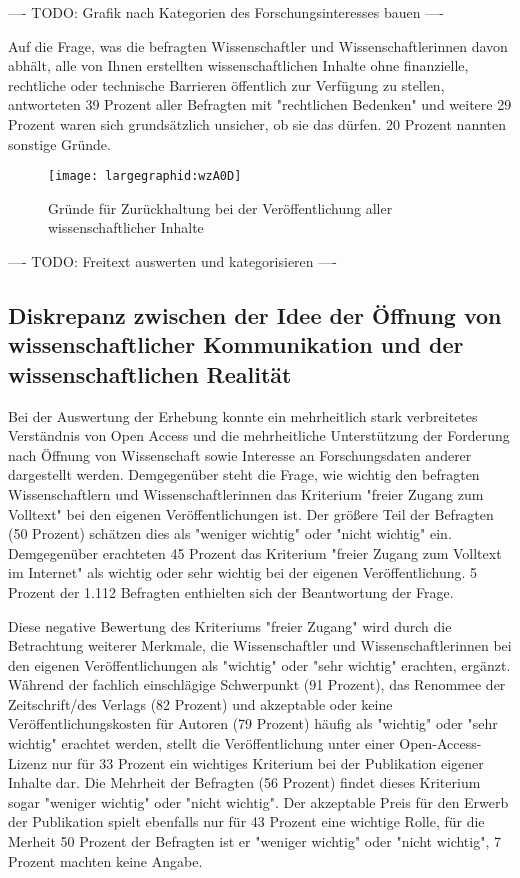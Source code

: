 ---- TODO: Grafik nach Kategorien des Forschungsinteresses bauen ----

Auf die Frage, was die befragten Wissenschaftler und Wissenschaftlerinnen davon abhält, alle von Ihnen erstellten wissenschaftlichen Inhalte ohne finanzielle, rechtliche oder technische Barrieren öffentlich zur Verfügung zu stellen, antworteten 39 Prozent aller Befragten mit "rechtlichen Bedenken" und weitere 29 Prozent waren sich grundsätzlich unsicher, ob sie das dürfen. 20 Prozent nannten sonstige Gründe.

\begin{figure}[h!]
\texttt{[image: largegraphid:wzA0D]}
\caption{Gründe für Zurückhaltung bei der Veröffentlichung aller wissenschaftlicher Inhalte}
\end{figure}

---- TODO: Freitext auswerten und kategorisieren ----

\subsection{Diskrepanz zwischen der Idee der Öffnung von wissenschaftlicher Kommunikation und der wissenschaftlichen Realität}

Bei der Auswertung der Erhebung konnte ein mehrheitlich stark verbreitetes Verständnis von Open Access und die mehrheitliche Unterstützung der Forderung nach Öffnung von Wissenschaft sowie Interesse an Forschungsdaten anderer dargestellt werden. Demgegenüber steht die Frage, wie wichtig den befragten Wissenschaftlern und Wissenschaftlerinnen das Kriterium "freier Zugang zum Volltext" bei den eigenen Veröffentlichungen ist. Der größere Teil der Befragten (50 Prozent) schätzen dies als "weniger wichtig" oder "nicht wichtig" ein. Demgegenüber erachteten 45 Prozent das Kriterium "freier Zugang zum Volltext im Internet" als wichtig oder sehr wichtig bei der eigenen Veröffentlichung. 5 Prozent der 1.112 Befragten enthielten sich der Beantwortung der Frage.

Diese negative Bewertung des Kriteriums "freier Zugang" wird durch die Betrachtung weiterer Merkmale, die Wissenschaftler und Wissenschaftlerinnen bei den eigenen Veröffentlichungen als "wichtig" oder "sehr wichtig" erachten, ergänzt. Während der fachlich einschlägige Schwerpunkt (91 Prozent), das Renommee der Zeitschrift/des Verlags (82 Prozent) und akzeptable oder keine Veröffentlichungskosten für Autoren (79 Prozent) häufig als "wichtig" oder "sehr wichtig" erachtet werden, stellt die Veröffentlichung unter einer Open-Access-Lizenz nur für 33 Prozent ein wichtiges Kriterium bei der Publikation eigener Inhalte dar. Die Mehrheit der Befragten (56 Prozent) findet dieses Kriterium sogar "weniger wichtig" oder "nicht wichtig". Der akzeptable Preis für den Erwerb der Publikation spielt ebenfalls nur für 43 Prozent eine wichtige Rolle, für die Merheit 50 Prozent der Befragten ist er "weniger wichtig" oder "nicht wichtig", 7 Prozent machten keine Angabe.

